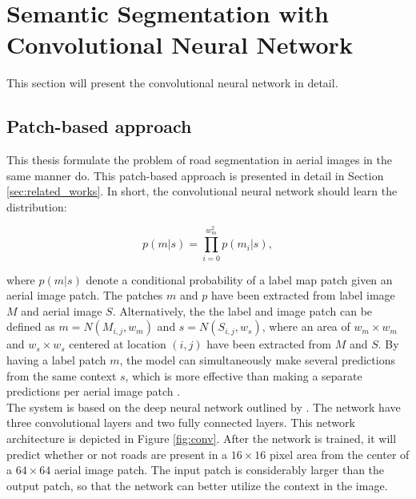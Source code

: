 \section{Semantic Segmentation with Convolutional Neural Network}
\label{sec:network}
This section will present the convolutional neural network in detail. 

\subsection{Patch-based approach}
This thesis formulate the problem of road segmentation in aerial images in the same manner  \cite{Mnih_roads_high_res_aerial_images} do. This patch-based approach is presented in detail in Section \ref{sec:related_works}. In short, the convolutional neural network should learn the distribution:

$$ p(m|s) = \prod_{i=0}^{w_m^2}p(m_i | s),  $$

where $p(m|s)$ denote a conditional probability of a label map patch given an aerial image patch. The patches $m$ and $p$ have been extracted from label image $M$ and aerial image $S$. Alternatively, the the label and image patch can be defined as $m =N(M_{i,j}, w_m)$ and $ s = N(S_{i,j}, w_s)$, where an area of $w_m \times w_m$ and $w_s \times w_s$ centered at location $(i, j)$ have been extracted from $M$ and $S$. By having a label patch $m$, the model can simultaneously make several predictions from the same context $s$, which is more effective than making a separate predictions per aerial image patch . \\ 


The system is based on the deep neural network outlined by \cite{Mnih_aerial_images_noisy}. The network have three convolutional layers and two fully connected layers. This network architecture is depicted in Figure \ref{fig:conv}. After the network is trained, it will predict whether or not roads are present in a $16 \times 16$ pixel area from the center of  a $64 \times 64$ aerial image patch. The input patch is considerably larger than the output patch, so that the network can better utilize the context in the image. \\


